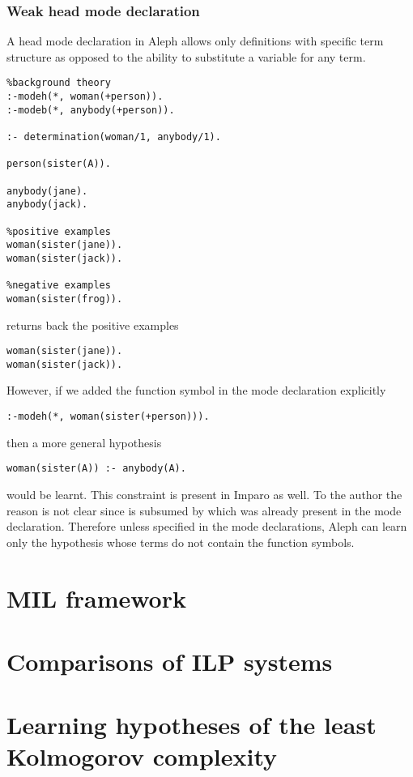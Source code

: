 \subsection{Weak head mode declaration}
A head mode declaration in Aleph allows only definitions with specific term structure as opposed to
the ability to substitute a variable for any term.

\begin{lstlisting}
%background theory
:-modeh(*, woman(+person)).
:-modeb(*, anybody(+person)).

:- determination(woman/1, anybody/1).

person(sister(A)).

anybody(jane).
anybody(jack).

%positive examples
woman(sister(jane)).
woman(sister(jack)).

%negative examples
woman(sister(frog)).
\end{lstlisting}

returns back the positive examples
\begin{lstlisting}
woman(sister(jane)).
woman(sister(jack)).
\end{lstlisting}

However, if we added the  function symbol in the mode declaration explicitly
\begin{lstlisting}
:-modeh(*, woman(sister(+person))).
\end{lstlisting}
then a more general hypothesis
\begin{lstlisting}
woman(sister(A)) :- anybody(A).
\end{lstlisting}
would be learnt. This constraint is present in Imparo as well. To the author the reason is not clear since  is subsumed by
 which was already present in the mode declaration. Therefore unless specified in the mode declarations, Aleph can learn only the hypothesis whose terms do not contain the function symbols.

\chapter{MIL framework}

\chapter{Comparisons of ILP systems}

\chapter{Learning hypotheses of the least Kolmogorov complexity}


